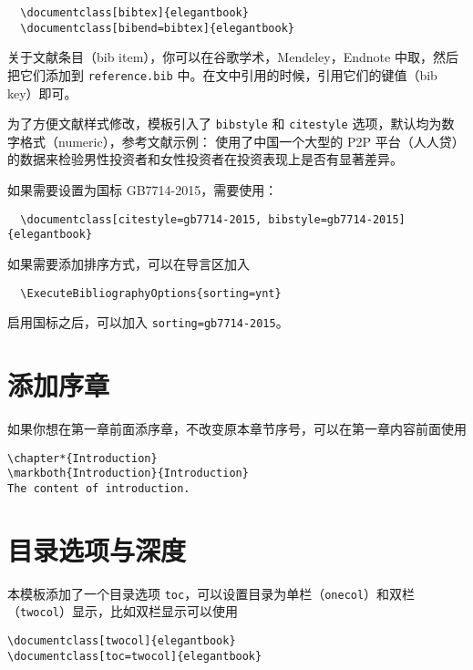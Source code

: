 \documentclass[lang=cn,10pt]{elegantbook}
\begin{document}
\begin{lstlisting}
  \documentclass[bibtex]{elegantbook}
  \documentclass[bibend=bibtex]{elegantbook}
\end{lstlisting}

关于文献条目（bib item），你可以在谷歌学术，Mendeley，Endnote 中取，然后把它们添加到 \lstinline{reference.bib} 中。在文中引用的时候，引用它们的键值（bib key）即可。

为了方便文献样式修改，模板引入了 \lstinline{bibstyle} 和 \lstinline{citestyle} 选项，默认均为数字格式（numeric），参考文献示例：\cite{cn1,en2,en3} 使用了中国一个大型的 P2P 平台（人人贷）的数据来检验男性投资者和女性投资者在投资表现上是否有显著差异。

如果需要设置为国标 GB7714-2015，需要使用：
\begin{lstlisting}
  \documentclass[citestyle=gb7714-2015, bibstyle=gb7714-2015]{elegantbook} 
\end{lstlisting}

如果需要添加排序方式，可以在导言区加入
\begin{lstlisting}
  \ExecuteBibliographyOptions{sorting=ynt}
\end{lstlisting}

启用国标之后，可以加入 \lstinline{sorting=gb7714-2015}。

\section{添加序章}

如果你想在第一章前面添序章，不改变原本章节序号，可以在第一章内容前面使用 
\begin{lstlisting}
\chapter*{Introduction}
\markboth{Introduction}{Introduction}
The content of introduction.
\end{lstlisting}

\section{目录选项与深度}
本模板添加了一个目录选项 \lstinline{toc}，可以设置目录为单栏（\lstinline{onecol}）和双栏（\lstinline{twocol}）显示，比如双栏显示可以使用
\begin{lstlisting}
\documentclass[twocol]{elegantbook}
\documentclass[toc=twocol]{elegantbook}
\end{lstlisting}
\end{document}
